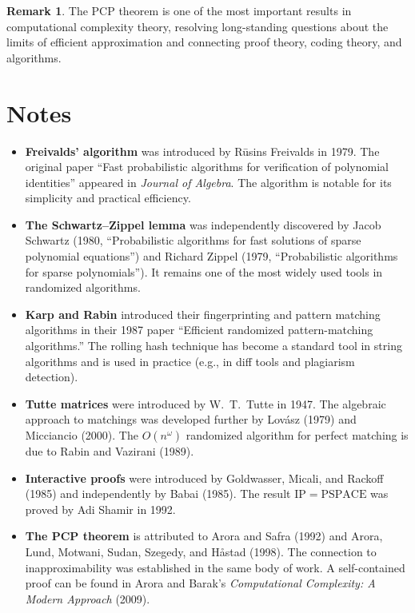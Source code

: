 \documentclass[twoside,12pt]{book}
\theoremstyle{plain}
\theoremstyle{definition}
\newtheorem{remark}[theorem]{Remark}
\theoremstyle{remark}
\begin{document}
\begin{remark}
The PCP theorem is one of the most important results in computational complexity theory, resolving long-standing questions about the limits of efficient approximation and connecting proof theory, coding theory, and algorithms.
\end{remark}


\section*{Notes}

\begin{itemize}[leftmargin=1.5em]
\item \textbf{Freivalds' algorithm} was introduced by R\=usins Freivalds in 1979. The original paper ``Fast probabilistic algorithms for verification of polynomial identities'' appeared in \emph{Journal of Algebra}. The algorithm is notable for its simplicity and practical efficiency.

\item \textbf{The Schwartz--Zippel lemma} was independently discovered by Jacob Schwartz (1980, ``Probabilistic algorithms for fast solutions of sparse polynomial equations'') and Richard Zippel (1979, ``Probabilistic algorithms for sparse polynomials''). It remains one of the most widely used tools in randomized algorithms.

\item \textbf{Karp and Rabin} introduced their fingerprinting and pattern matching algorithms in their 1987 paper ``Efficient randomized pattern-matching algorithms.'' The rolling hash technique has become a standard tool in string algorithms and is used in practice (e.g., in diff tools and plagiarism detection).

\item \textbf{Tutte matrices} were introduced by W.\ T.\ Tutte in 1947. The algebraic approach to matchings was developed further by Lov\'asz (1979) and Micciancio (2000). The $O(n^\omega)$ randomized algorithm for perfect matching is due to Rabin and Vazirani (1989).

\item \textbf{Interactive proofs} were introduced by Goldwasser, Micali, and Rackoff (1985) and independently by Babai (1985). The result $\mathrm{IP} = \mathrm{PSPACE}$ was proved by Adi Shamir in 1992.

\item \textbf{The PCP theorem} is attributed to Arora and Safra (1992) and Arora, Lund, Motwani, Sudan, Szegedy, and Håstad (1998). The connection to inapproximability was established in the same body of work. A self-contained proof can be found in Arora and Barak's \emph{Computational Complexity: A Modern Approach} (2009).
\end{itemize}
\end{document}
